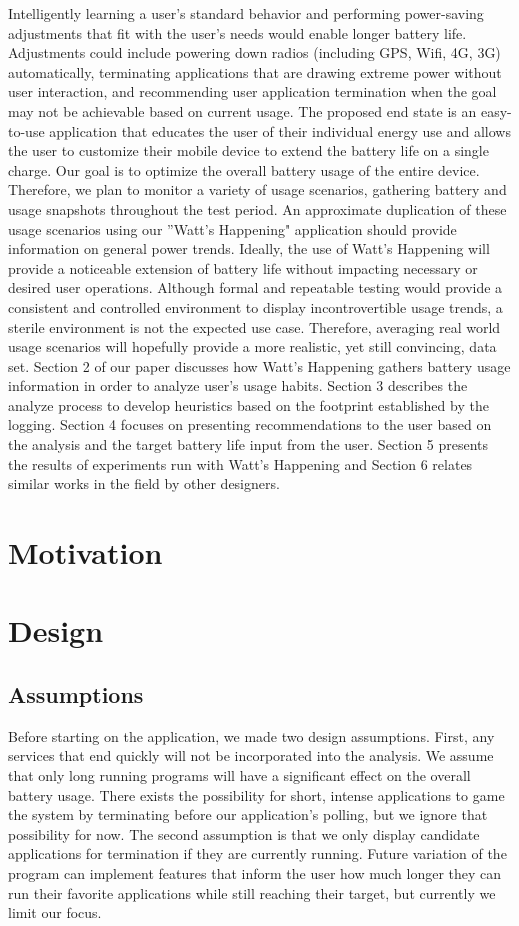 \documentclass[11pt,twocolumn]{article}
\begin{document}
Intelligently learning a user's standard behavior and performing power-saving adjustments that fit with the user's needs would enable longer battery life. 
Adjustments could include powering down radios (including GPS, Wifi, 4G, 3G) automatically, terminating applications that are drawing extreme power without user interaction, and recommending user application termination when the goal may not be achievable based on current usage. 
The proposed end state is an easy-to-use application that educates the user of their individual energy use and allows the user to customize their mobile device to extend the battery life on a single charge.
Our goal is to optimize the overall battery usage of the entire device. 
Therefore, we plan to monitor a variety of usage scenarios, gathering battery and usage snapshots throughout the test period. 
An approximate duplication of these usage scenarios using our ''Watt's Happening" application should provide information on general power trends. 
Ideally, the use of Watt's Happening will provide a noticeable extension of battery life without impacting necessary or desired user operations.  
Although formal and repeatable testing would provide a consistent and controlled environment to display incontrovertible usage trends, a sterile environment is not the expected use case. 
Therefore, averaging real world usage scenarios will hopefully provide a more realistic, yet still convincing, data set.
Section 2 of our paper discusses how Watt's Happening gathers battery usage information in order to analyze user's usage habits.  
Section 3 describes the analyze process to develop heuristics based on the footprint established by the logging.  
Section 4 focuses on presenting recommendations to the user based on the analysis and the target battery life input from the user.  
Section 5 presents the results of experiments run with Watt's Happening and Section 6 relates similar works in the field by other designers.


\section*{Motivation}


\section*{Design}
\subsection*{Assumptions}
Before starting on the application, we made two design assumptions.  
First, any services that end quickly will not be incorporated into the analysis.  
We assume that only long running programs will have a significant effect on the overall battery usage.  
There exists the possibility for short, intense applications to game the system by terminating before our application's polling, but we ignore that possibility for now.  
The second assumption is that we only display candidate applications for termination if they are currently running.  
Future variation of the program can implement features that inform the user how much longer they can run their favorite applications while still reaching their target, but currently we limit our focus.
\end{document}
